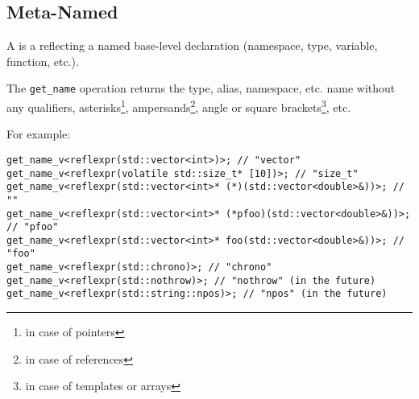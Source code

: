 \subsection{Meta-Named}
\label{concept-Meta-Named}

A  is a  reflecting a named base-level declaration
(namespace, type, variable, function, etc.).





The \texttt{get\_name} operation returns the type, alias, namespace, etc.
name without any qualifiers, asterisks\footnote{in case of pointers},
ampersands\footnote{in case of references}, angle or square brackets\footnote{
in case of templates or arrays}, etc.

For example:

\begin{verbatim}
get_name_v<reflexpr(std::vector<int>)>; // "vector"
get_name_v<reflexpr(volatile std::size_t* [10])>; // "size_t"
get_name_v<reflexpr(std::vector<int>* (*)(std::vector<double>&))>; // ""
get_name_v<reflexpr(std::vector<int>* (*pfoo)(std::vector<double>&))>; // "pfoo"
get_name_v<reflexpr(std::vector<int>* foo(std::vector<double>&))>; // "foo"
get_name_v<reflexpr(std::chrono)>; // "chrono"
get_name_v<reflexpr(std::nothrow)>; // "nothrow" (in the future)
get_name_v<reflexpr(std::string::npos)>; // "npos" (in the future)
\end{verbatim}
